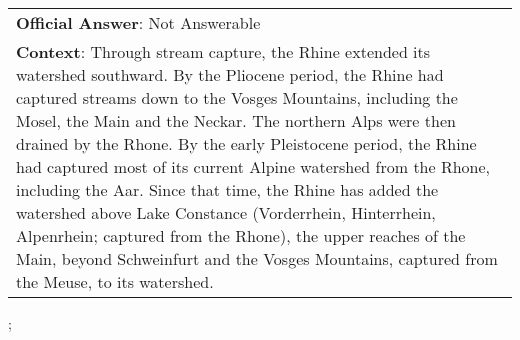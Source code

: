 \begin{figure*}[ht]
{\begin{tabular}{p{}}
            \textbf{Official Answer}: Not Answerable                                                                                                                                                                                                                                                                                                                                                                                                                                                                                                                                                                                                                                   \\
            \textbf{Context}: Through stream capture, the Rhine extended its watershed southward. By the Pliocene period, the Rhine had captured streams down to the Vosges Mountains, including the Mosel, the Main and the Neckar. The northern Alps were then drained by the Rhone. By the early Pleistocene period, the Rhine had captured most of its current Alpine watershed from the Rhone, including the Aar. Since that time, the Rhine has added the watershed above Lake Constance (Vorderrhein, Hinterrhein, Alpenrhein; captured from the Rhone), the upper reaches of the Main, beyond Schweinfurt and the Vosges Mountains, captured from the Meuse, to its watershed. \\
        \end{tabular}
    };
    \label{fig:ex-5ad2990cd7d075001a429b61}
\end{figure*}

